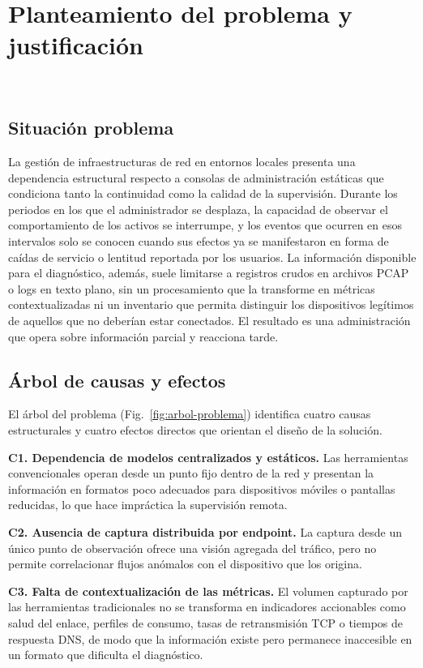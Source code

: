 \section{Planteamiento del problema y justificación}
~\label{sec:problema}

\subsection{Situación problema}

La gestión de infraestructuras de red en entornos locales 
presenta una dependencia estructural respecto a consolas de 
administración estáticas que condiciona tanto la continuidad como la 
calidad de la supervisión. Durante los periodos en los que el 
administrador se desplaza, la capacidad de observar el 
comportamiento de los activos se interrumpe, y los eventos que 
ocurren en esos intervalos solo se conocen cuando sus efectos ya se 
manifestaron en forma de caídas de servicio o lentitud reportada por 
los usuarios. La información disponible para el diagnóstico, además, 
suele limitarse a registros crudos en archivos PCAP o logs en texto 
plano, sin un procesamiento que la transforme en métricas 
contextualizadas ni un inventario que permita distinguir los 
dispositivos legítimos de aquellos que no deberían estar conectados. 
El resultado es una administración que opera sobre información 
parcial y reacciona tarde.

\subsection{Árbol de causas y efectos}

El árbol del problema (Fig.~\ref{fig:arbol-problema}) identifica 
cuatro causas estructurales y cuatro efectos directos que orientan el 
diseño de la solución.

\noindent\textbf{C1. Dependencia de modelos centralizados y estáticos.} 
Las herramientas convencionales operan desde un punto fijo dentro de 
la red y presentan la información en formatos poco adecuados para 
dispositivos móviles o pantallas reducidas, lo que hace impráctica la 
supervisión remota.

\noindent\textbf{C2. Ausencia de captura distribuida por endpoint.} 
La captura desde un único punto de observación ofrece una visión 
agregada del tráfico, pero no permite correlacionar flujos anómalos 
con el dispositivo que los origina.

\noindent\textbf{C3. Falta de contextualización de las métricas.} 
El volumen capturado por las herramientas tradicionales no se 
transforma en indicadores accionables como salud del enlace, perfiles 
de consumo, tasas de retransmisión TCP o tiempos de respuesta DNS, de 
modo que la información existe pero permanece inaccesible en un 
formato que dificulta el diagnóstico.

